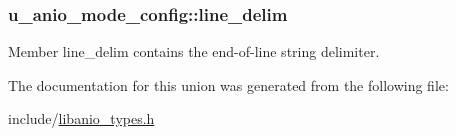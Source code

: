 \subsubsection[{line\+\_\+delim}]{\setlength{\rightskip}{0pt plus 5cm}u\+\_\+anio\+\_\+mode\+\_\+config\+::line\+\_\+delim}\label{unionu__anio__mode__config_ad7eb0740f3431ba4cd248f59d2c3a59b}
Member \textquotesingle{}line\+\_\+delim\textquotesingle{} contains the end-\/of-\/line string delimiter. 

The documentation for this union was generated from the following file\+:\begin{DoxyCompactItemize}
\item 
include/\hyperlink{libanio__types_8h}{libanio\+\_\+types.\+h}\end{DoxyCompactItemize}
